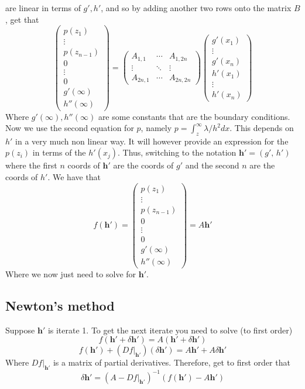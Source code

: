 \documentclass{article}
\newcommand{\bs}{\boldsymbol}                               %
\begin{document}
are linear in terms of $g',h'$, and so by adding another two rows onto the matrix
$B$, get that
\[ \left( \begin{array}{c} p(z_1) \\ \vdots \\ p(z_{n-1}) \\[4pt] 0 \\ \vdots \\
0 \\ g'(\infty) \\ h''(\infty) \end{array} \right) =
\left( \begin{array}{ccc} A_{1,1} & \cdots & A_{1 , 2n} \\
\vdots & \ddots & \vdots \\ A_{2n,1} & \cdots & A_{2n , 2n} 
\end{array}
\right)
 \left( \begin{array}{c} g'(x_1) \\ \vdots \\ g'(x_n) \\[4pt] h'(x_1) \\ \vdots
\\ h'(x_n) \end{array} \right) \]
Where $g'(\infty), h''(\infty)$ are some constants that are the boundary 
conditions. 
\\

Now we use the second equation for $p$, namely $p=\int_z^{\infty} 
\lambda/h^2 dx$. This depends on $h'$ in a very much non linear way.
It will however provide an expression for the $p(z_i)$ in terms of
the $h'(x_j)$. Thus, switching to the notation  
$\bs{h}'=(g',\,h')$ where the first $n$ coords of $\bs{h}'$ are the
coords of $g'$ and the second $n$ are the coords of $h'$. We have that
\[ f(\bs{h}') = \left( \begin{array}{c} p(z_1) \\ \vdots \\ p(z_{n-1}) 
\\[4pt] 0 \\ \vdots \\ 0 \\ g'(\infty) \\ h''(\infty) \end{array} \right) =
 A  \bs{h}' \]
Where we now just need to solve for $\bs{h}'$.

\subsection*{Newton's method}
Suppose $\bs{h}'$ is iterate 1. To get the next iterate you need to solve (to 
first order)
\[ f(\bs{h}'+\delta\bs{h}') = A(\bs{h}'+\delta \bs{h}')\]
\[ f(\bs{h}') + (Df|_{\bs{h}'})(\delta\bs{h}') = A\bs{h}'+A\delta \bs{h}'\]
Where $Df|_{\bs{h}'}$ is a matrix of partial derivatives. Therefore, get to 
first order that 
\[ \delta \bs{h}' =  (A-Df|_{\bs{h}'})^{-1}(f(\bs{h}') - A\bs{h}') \]
\end{document}
